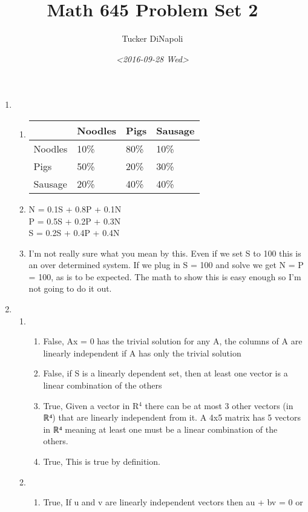 \documentclass[11pt]{article}
\author{Tucker DiNapoli}
\date{\textit{<2016-09-28 Wed>}}
\title{Math 645 Problem Set 2}
\begin{document}
\maketitle
\begin{enumerate}
\item \begin{enumerate}
\item \begin{center}
\begin{tabular}{llll}
 & Noodles & Pigs & Sausage\\
\hline
Noodles & 10\% & 80\% & 10\%\\
Pigs & 50\% & 20\% & 30\%\\
Sausage & 20\% & 40\% & 40\%\\
\end{tabular}
\end{center}
\item N = 0.1S + 0.8P + 0.1N\\
P = 0.5S + 0.2P + 0.3N\\
S = 0.2S + 0.4P + 0.4N\\
\item I'm not really sure what you mean by this. Even if we set S to 100 this
is an over determined system. If we plug in S = 100 and solve we get
N = P = 100, as is to be expected. The math to show this is easy enough
so I'm not going to do it out.
\end{enumerate}
\item \begin{enumerate}
\item \begin{enumerate}
\item False, Ax = 0 has the trivial solution for any A, the columns of A are
linearly independent if A has only the trivial solution
\item False, if S is a linearly dependent set, then at least one vector is a
linear combination of the others
\item True, Given a vector in R\(^{\text{4}}\) there can be at most 3 other vectors
(in ℝ⁴) that are linearly independent from it. A 4x5 matrix has 5
vectors in  ℝ⁴ meaning at least one must be a linear combination of
the others.
\item True, This is true by definition.
\end{enumerate}
\item \begin{enumerate}
\item True, If u and v are linearly independent vectors then au + bv = 0 or

\end{enumerate}
\end{enumerate}
\end{enumerate}
\end{document}
